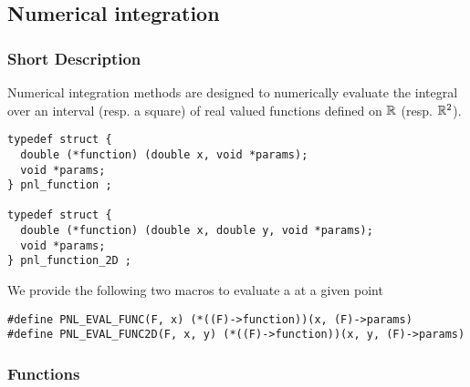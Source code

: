 \subsection{Numerical integration}
\subsubsection{Short Description}

Numerical integration methods are designed to numerically evaluate the
integral over an interval (resp. a square) of real valued functions defined on
${\mathbb R}$ (resp. ${\mathbb R}^2$).

\begin{verbatim}
typedef struct {
  double (*function) (double x, void *params);
  void *params;
} pnl_function ;

typedef struct {
  double (*function) (double x, double y, void *params);
  void *params;
} pnl_function_2D ;
\end{verbatim}

We provide the following two macros to evaluate a  at
a given point
\begin{verbatim}
#define PNL_EVAL_FUNC(F, x) (*((F)->function))(x, (F)->params)
#define PNL_EVAL_FUNC2D(F, x, y) (*((F)->function))(x, y, (F)->params)
\end{verbatim}



\subsubsection{Functions}

